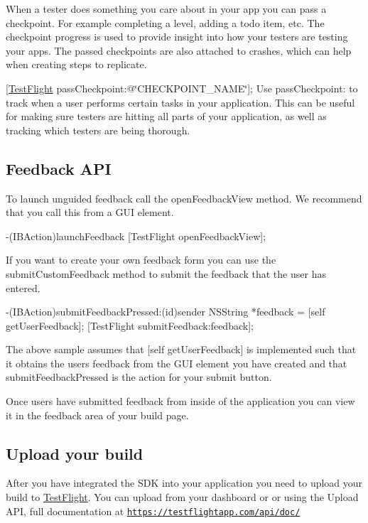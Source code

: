 When a tester does something you care about in your app you can pass a checkpoint. For example completing a level, adding a todo item, etc. The checkpoint progress is used to provide insight into how your testers are testing your apps. The passed checkpoints are also attached to crashes, which can help when creating steps to replicate.

{\ttfamily \mbox{[}\hyperlink{interface_test_flight}{Test\-Flight} pass\-Checkpoint\-:@\char`\"{}\-C\-H\-E\-C\-K\-P\-O\-I\-N\-T\-\_\-\-N\-A\-M\-E\char`\"{}\mbox{]};} Use {\ttfamily pass\-Checkpoint\-:} to track when a user performs certain tasks in your application. This can be useful for making sure testers are hitting all parts of your application, as well as tracking which testers are being thorough.

\subsection*{Feedback A\-P\-I}

To launch unguided feedback call the open\-Feedback\-View method. We recommend that you call this from a G\-U\-I element. \begin{DoxyVerb}-(IBAction)launchFeedback {
    [TestFlight openFeedbackView];
}
\end{DoxyVerb}


If you want to create your own feedback form you can use the submit\-Custom\-Feedback method to submit the feedback that the user has entered. \begin{DoxyVerb}-(IBAction)submitFeedbackPressed:(id)sender {
    NSString *feedback = [self getUserFeedback];
    [TestFlight submitFeedback:feedback];
}
\end{DoxyVerb}


The above sample assumes that \mbox{[}self get\-User\-Feedback\mbox{]} is implemented such that it obtains the users feedback from the G\-U\-I element you have created and that submit\-Feedback\-Pressed is the action for your submit button.

Once users have submitted feedback from inside of the application you can view it in the feedback area of your build page.

\subsection*{Upload your build}

After you have integrated the S\-D\-K into your application you need to upload your build to \hyperlink{interface_test_flight}{Test\-Flight}. You can upload from your dashboard or or using the Upload A\-P\-I, full documentation at \href{https://testflightapp.com/api/doc/}{\tt https\-://testflightapp.\-com/api/doc/}

